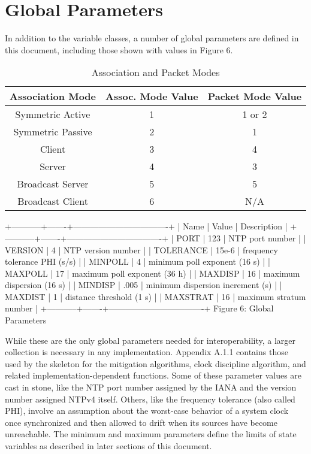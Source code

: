 \section{Global Parameters}

In addition to the variable classes, a number of global parameters
are defined in this document, including those shown with values in
Figure 6.

\begin{table}[htb]
\center
\begin{tabular}{c | c | c}
Association Mode & Assoc. Mode Value & Packet Mode Value \\
\hline
\hline
Symmetric Active & 1 & 1 or 2 \\
Symmetric Passive & 2 & 1 \\
Client & 3 & 4 \\
Server & 4 & 3 \\
Broadcast Server & 5 & 5 \\
Broadcast Client & 6 & N/A \\
\hline
\end{tabular}
\label{association_and_packet_modes}
\caption{Association and Packet Modes}
\end{table}

+-----------+-------+----------------------------------+
| Name | Value | Description |
+-----------+-------+----------------------------------+
| PORT | 123 | NTP port number |
| VERSION | 4 | NTP version number |
| TOLERANCE | 15e-6 | frequency tolerance PHI (s/s) |
| MINPOLL | 4 | minimum poll exponent (16 s) |
| MAXPOLL | 17 | maximum poll exponent (36 h) |
| MAXDISP | 16 | maximum dispersion (16 s) |
| MINDISP | .005 | minimum dispersion increment (s) |
| MAXDIST | 1 | distance threshold (1 s) |
| MAXSTRAT | 16 | maximum stratum number |
+-----------+-------+----------------------------------+
Figure 6: Global Parameters

While these are the only global parameters needed for
interoperability, a larger collection is necessary in any
implementation. Appendix A.1.1 contains those used by the skeleton
for the mitigation algorithms, clock discipline algorithm, and
related implementation-dependent functions. Some of these parameter
values are cast in stone, like the NTP port number assigned by the
IANA and the version number assigned NTPv4 itself. Others, like the
frequency tolerance (also called PHI), involve an assumption about
the worst-case behavior of a system clock once synchronized and then
allowed to drift when its sources have become unreachable. The
minimum and maximum parameters define the limits of state variables
as described in later sections of this document.

